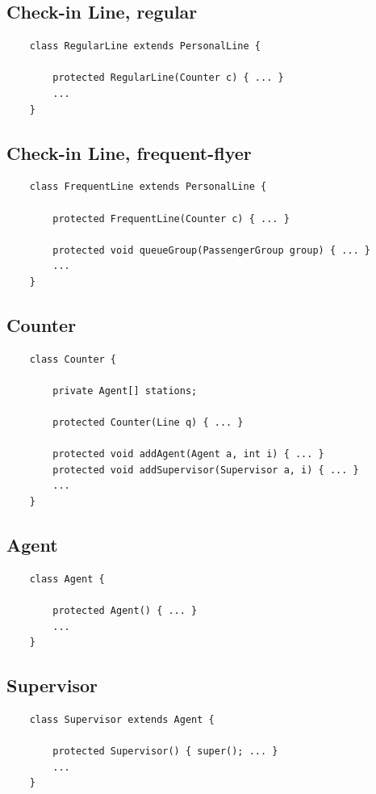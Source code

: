 \documentclass{article}
\begin{document}
\pagebreak

\subsection{Check-in Line, regular}
\begin{verbatim}
    class RegularLine extends PersonalLine {
        
        protected RegularLine(Counter c) { ... }
        ...
    }
\end{verbatim}

\subsection{Check-in Line, frequent-flyer}
\begin{verbatim}
    class FrequentLine extends PersonalLine {
        
        protected FrequentLine(Counter c) { ... }

        protected void queueGroup(PassengerGroup group) { ... }
        ...
    }
\end{verbatim}

\subsection{Counter}
\begin{verbatim}
    class Counter {

        private Agent[] stations;
        
        protected Counter(Line q) { ... }

        protected void addAgent(Agent a, int i) { ... }
        protected void addSupervisor(Supervisor a, i) { ... }
        ...
    }
\end{verbatim}

\subsection{Agent}
\begin{verbatim}
    class Agent {
        
        protected Agent() { ... }
        ...
    }
\end{verbatim}

\subsection{Supervisor}
\begin{verbatim}
    class Supervisor extends Agent {
        
        protected Supervisor() { super(); ... }
        ...
    }
\end{verbatim}
\end{document}
